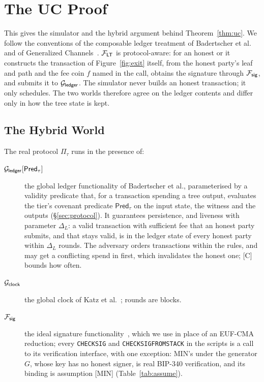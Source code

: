 \section{The UC Proof}\label{app:uc}

This \thispart{} gives the simulator and the hybrid argument behind
Theorem~\ref{thm:uc}. We follow the conventions of the composable ledger
treatment of Badertscher et al.~\cite{bmtz17} and of Generalized
Channels~\cite{genchannels}. $\mathcal{F}_{\mathsf{LT}}$ is protocol-aware: for an honest
 or  it constructs the transaction of
Figure~\ref{fig:exit} itself, from the honest party's leaf and path and
the fee coin $f$ named in the call, obtains the signature through
$\mathcal{F}_{\mathsf{sig}}$, and submits it to $\mathcal{G}_{\mathsf{ledger}}$. The simulator never builds an
honest transaction; it only schedules. The two worlds therefore agree on
the ledger contents and differ only in how the tree state is kept.

\subsection{The Hybrid World}

The real protocol $\Pi_\tau$ runs in the presence of:

\begin{description}
\item[{$\mathcal{G}_{\mathsf{ledger}}[\mathsf{Pred}_\tau]$}] the global ledger functionality of
  Badertscher et al., parameterised by a validity predicate that, for a
  transaction spending a tree output, evaluates the tier's covenant
  predicate $\mathsf{Pred}_\tau$ on the input state, the witness and the
  outputs (\S\ref{sec:protocol}). It guarantees persistence, and liveness
  with parameter $\Delta_L$: a valid transaction with sufficient fee that
  an honest party submits, and that stays valid, is in the ledger state of
  every honest party within $\Delta_L$ rounds. The adversary orders
  transactions within the rules, and may get a conflicting spend in first,
  which invalidates the honest one; [C] bounds how often.
\item[$\mathcal{G}_{\mathsf{clock}}$] the global clock of Katz et al.~\cite{kmtz13}; rounds are
  blocks.
\item[$\mathcal{F}_{\mathsf{sig}}$] the ideal signature functionality~\cite{canettiSig}, which
  we use in place of an EUF-CMA reduction; every \texttt{CHECKSIG} and
  \texttt{CHECKSIGFROMSTACK} in the scripts is a call to its verification
  interface, with one exception: MIN's  under the generator
  $G$, whose key has no honest signer, is real BIP-340 verification, and
  its binding is assumption [MIN] (Table~\ref{tab:assume}).
\end{description}

